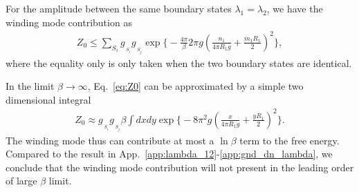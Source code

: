 For the amplitude between the same boundary states $\lambda_1=\lambda_2$, we have the winding mode contribution as
\begin{equation}
\begin{aligned}
\label{eq:Z0}
Z_0 \le  \sum_{S_i} g_{\,\!_{S_i} }g_{\,\!_{S_j} } \exp\Big\{- \frac{4\pi}{\beta} 2 \pi g ( \frac{n_1}{ 4 \pi R_1 g} + \frac{m_1 R_1 }{ 2} )^2 \Big\},
\end{aligned}
\end{equation}
where the equality only is only taken when the two boundary states are identical. 

In the limit $\beta\rightarrow\infty$, Eq.~\eqref{eq:Z0} can be approximated by a simple two dimensional integral
\begin{equation}\begin{aligned}
Z_0\approx g_{\,\!_{S_i} }g_{\,\!_{S_j} }\beta\int dxdy\exp\Big\{-8 \pi^2 g ( \frac{x}{ 4 \pi R_1 g} + \frac{y R_1 }{ 2} )^2 \Big\}.
\end{aligned}\end{equation}
The winding mode thus can contribute at most a $\ln\beta$ term to the free energy. Compared to the result in App.~\ref{app:lambda_12}-\ref{app:gnd_dn_lambda}, we conclude that the winding mode contribution will not present in the leading order of large $\beta$ limit. 



